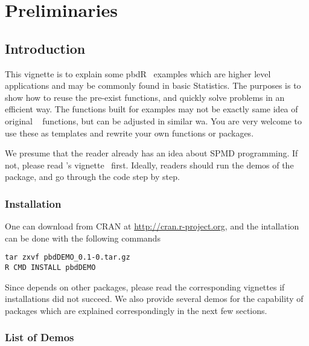 \part{Preliminaries}


\chapter[Introduction]{Introduction}
\label{sec:introduction}

This vignette is to explain some pbdR~\citep{pbdR2012}
examples which are higher level
applications and may be commonly found in basic Statistics.
The purposes is to show how to reuse the pre-exist functions, and
quickly solve problems in an efficient way.
The functions built for examples may not be exactly same idea of original
~\citep{Rcore}
functions, but can be adjusted in similar wa.
You are very welcome to use these as templates and rewrite your own functions
or packages.

We presume that the reader already has an idea about SPMD programming. If not,
please read 's vignette~\citep{Chen2012pbdMPIvignette} first.
Ideally, readers should run the demos of the  package,
and go through the code step by step.

\section[Installation]{Installation}
\label{sec:installation}

One can download  from CRAN at
\url{http://cran.r-project.org}, and
the intallation can be done with the following commands
\begin{lstlisting}
tar zxvf pbdDEMO_0.1-0.tar.gz
R CMD INSTALL pbdDEMO
\end{lstlisting}
Since  depends on other  packages,
please read the corresponding vignettes if installations did
not succeed.
We also provide several demos for the capability of 
packages which are explained correspondingly in the next few sections.


\section{List of Demos}

